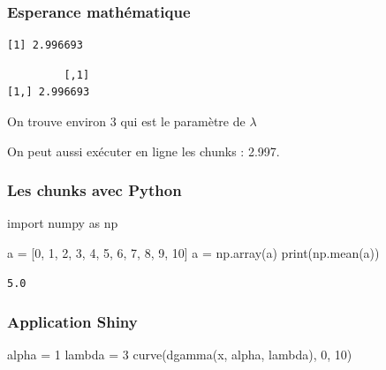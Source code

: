 \documentclass[
  french,
  letterpaper,
  DIV=11,
  numbers=noendperiod]{scrartcl}
\newenvironment{Shaded}{\begin{snugshade}}{\end{snugshade}}
\newcommand{\BuiltInTok}[1]{\textcolor[rgb]{0.00,0.23,0.31}{#1}}
\newcommand{\DecValTok}[1]{\textcolor[rgb]{0.68,0.00,0.00}{#1}}
\newcommand{\FunctionTok}[1]{\textcolor[rgb]{0.28,0.35,0.67}{#1}}
\newcommand{\ImportTok}[1]{\textcolor[rgb]{0.00,0.46,0.62}{#1}}
\newcommand{\NormalTok}[1]{\textcolor[rgb]{0.00,0.23,0.31}{#1}}
\newcommand{\OperatorTok}[1]{\textcolor[rgb]{0.37,0.37,0.37}{#1}}
\newcommand{\OtherTok}[1]{\textcolor[rgb]{0.00,0.23,0.31}{#1}}
\begin{document}
\subsubsection{Esperance mathématique}\label{esperance-mathuxe9matique}

\begin{verbatim}
[1] 2.996693
\end{verbatim}

\begin{verbatim}
         [,1]
[1,] 2.996693
\end{verbatim}

On trouve environ 3 qui est le paramètre de \(\lambda\)

On peut aussi exécuter en ligne les chunks : 2.997.

\subsubsection{Les chunks avec Python}\label{les-chunks-avec-python}

\begin{Shaded}
\begin{Highlighting}[]
\ImportTok{import}\NormalTok{ numpy }\ImportTok{as}\NormalTok{ np}
\end{Highlighting}
\end{Shaded}

\begin{Shaded}
\begin{Highlighting}[]
\NormalTok{a }\OperatorTok{=}\NormalTok{ [}\DecValTok{0}\NormalTok{, }\DecValTok{1}\NormalTok{, }\DecValTok{2}\NormalTok{, }\DecValTok{3}\NormalTok{, }\DecValTok{4}\NormalTok{, }\DecValTok{5}\NormalTok{, }\DecValTok{6}\NormalTok{, }\DecValTok{7}\NormalTok{, }\DecValTok{8}\NormalTok{, }\DecValTok{9}\NormalTok{, }\DecValTok{10}\NormalTok{]}
\NormalTok{a }\OperatorTok{=}\NormalTok{ np.array(a)}
\BuiltInTok{print}\NormalTok{(np.mean(a))}
\end{Highlighting}
\end{Shaded}

\begin{verbatim}
5.0
\end{verbatim}

\subsubsection{Application Shiny}\label{application-shiny}

\begin{Shaded}
\begin{Highlighting}[]
\NormalTok{alpha }\OtherTok{=} \DecValTok{1}
\NormalTok{lambda }\OtherTok{=} \DecValTok{3}
\FunctionTok{curve}\NormalTok{(}\FunctionTok{dgamma}\NormalTok{(x, alpha, lambda), }\DecValTok{0}\NormalTok{, }\DecValTok{10}\NormalTok{)}
\end{Highlighting}
\end{Shaded}
\end{document}
